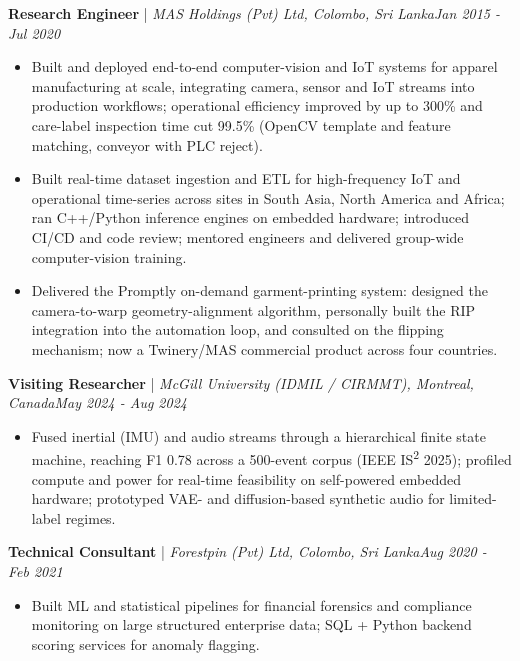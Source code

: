 \documentclass[11pt]{article}
\newenvironment{cvrole}[5]{%
  \par\noindent\textbf{\large #1} | \textit{\small #2, #3}\hfill \textit{\small #4 - #5}\par
  \begin{itemize}[leftmargin=2em, itemsep=-0.3em, topsep=-0.5em]%
}{%
  \end{itemize}\par\noindent\mbox{}\par\vspace{0.1em}%
}
\begin{document}
\begin{cvrole}{Research Engineer}{MAS Holdings (Pvt) Ltd}{Colombo, Sri Lanka}{Jan 2015}{Jul 2020}
    \item Built and deployed end-to-end computer-vision and IoT systems for apparel manufacturing at scale, integrating camera, sensor and IoT streams into production workflows; operational efficiency improved by up to 300\% and care-label inspection time cut 99.5\% (OpenCV template and feature matching, conveyor with PLC reject).
    \item Built real-time dataset ingestion and ETL for high-frequency IoT and operational time-series across sites in South Asia, North America and Africa; ran C++/Python inference engines on embedded hardware; introduced CI/CD and code review; mentored engineers and delivered group-wide computer-vision training.
    \item Delivered the Promptly on-demand garment-printing system: designed the camera-to-warp geometry-alignment algorithm, personally built the RIP integration into the automation loop, and consulted on the flipping mechanism; now a Twinery/MAS commercial product across four countries.
\end{cvrole}

\begin{cvrole}{Visiting Researcher}{McGill University (IDMIL / CIRMMT)}{Montreal, Canada}{May 2024}{Aug 2024}
    \item Fused inertial (IMU) and audio streams through a hierarchical finite state machine, reaching F1 0.78 across a 500-event corpus (IEEE IS\textsuperscript{2} 2025); profiled compute and power for real-time feasibility on self-powered embedded hardware; prototyped VAE- and diffusion-based synthetic audio for limited-label regimes.
\end{cvrole}

\begin{cvrole}{Technical Consultant}{Forestpin (Pvt) Ltd}{Colombo, Sri Lanka}{Aug 2020}{Feb 2021}
    \item Built ML and statistical pipelines for financial forensics and compliance monitoring on large structured enterprise data; SQL + Python backend scoring services for anomaly flagging.
\end{cvrole}

\enlargethispage{5\baselineskip}
\end{document}
